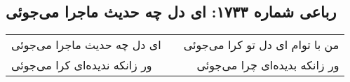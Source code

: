 \begin{center}
\section*{رباعی شماره ۱۷۳۳: ای دل چه حدیث ماجرا می‌جوئی}
\label{sec:1733}
\begin{longtable}{l p{0.5cm} r}
ای دل چه حدیث ماجرا می‌جوئی
&&
من با توام ای دل تو کرا می‌جوئی
\\
ور زانکه ندیده‌ای کرا می‌جوئی
&&
ور زانکه بدیده‌ای چرا می‌جوئی
\\
\end{longtable}
\end{center}
